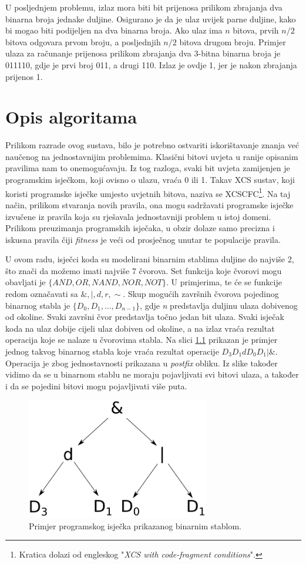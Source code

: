 \documentclass[times, utf8, zavrsni]{fer}
\begin{document}
U posljednjem problemu, izlaz mora biti bit prijenosa prilikom zbrajanja dva binarna broja jednake duljine.
Osigurano je da je ulaz uvijek parne duljine, kako bi mogao biti podijeljen na dva binarna broja.
Ako ulaz ima $n$ bitova, prvih $n / 2$ bitova odgovara prvom broju, a posljednjih $n / 2$ bitova drugom broju.
Primjer ulaza za računanje prijenosa prilikom zbrajanja dva 3-bitna binarna broja je 011110, gdje je prvi broj 011, a drugi 110.
Izlaz je ovdje 1, jer je nakon zbrajanja prijenos 1.

\chapter{Opis algoritama} \label{algs}
Prilikom razrade ovog sustava, bilo je potrebno ostvariti iskorištavanje znanja već naučenog na jednostavnijim problemima.
Klasični bitovi uvjeta u ranije opisanim pravilima nam to onemogućavaju.
Iz tog razloga, svaki bit uvjeta zamijenjen je programskim isječkom, koji ovisno o ulazu, vraća 0 ili 1.
Takav XCS sustav, koji koristi programske isječke umjesto uvjetnih bitova, naziva se XCSCFC\footnote{Kratica dolazi od engleskog "\emph{XCS with code-fragment conditions}".}.
Na taj način, prilikom stvaranja novih pravila, ona mogu sadržavati programske isječke izvučene iz pravila koja su rješavala jednostavniji problem u istoj domeni.
Prilikom preuzimanja programskih isječaka, u obzir dolaze samo precizna i iskusna pravila čiji \emph{fitness} je veći od prosječnog unutar te populacije pravila. \citep{4}

U ovom radu, isječci koda su modelirani binarnim stablima duljine do najviše 2, što znači da možemo imati najviše 7 čvorova.
Set funkcija koje čvorovi mogu obavljati je $\{AND, OR, NAND, NOR, NOT\}$.
U primjerima, te će se funkcije redom označavati sa $\&, |, d, r, \sim$.
Skup mogućih završnih čvorova pojedinog binarnog stabla je $\{D_{0}, D_{1}, ..., D_{n - 1}\}$, gdje \emph{n} predstavlja duljinu ulaza dobivenog od okoline.
Svaki završni čvor predstavlja točno jedan bit ulaza.
Svaki isječak koda na ulaz dobije cijeli ulaz dobiven od okoline, a na izlaz vraća rezultat operacija koje se nalaze u čvorovima stabla.
Na slici \ref{tree} prikazan je primjer jednog takvog binarnog stabla koje vraća rezultat operacije $D_{3}D_{1}dD_{0}D_{1}|\&$.
Operacija je zbog jednostavnosti prikazana u \emph{postfix} obliku.
Iz slike također vidimo da se u binarnom stablu ne moraju pojavljivati svi bitovi ulaza, a također i da se pojedini bitovi mogu pojavljivati više puta.
\begin{figure}[h]
    \centering
    \includegraphics[width=8cm]{img/tree.pdf}
    \caption{Primjer programskog isječka prikazanog binarnim stablom.}
    \label{tree}
\end{figure}
\end{document}
